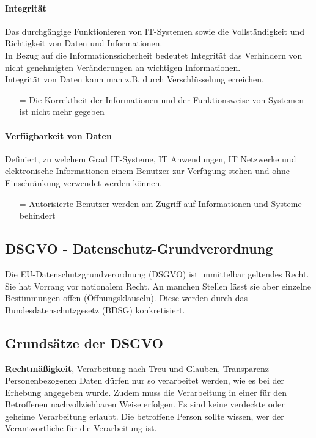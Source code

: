 \documentclass[asp1.tex]{subfiles}
\begin{document}
\paragraph{Integrität}
Das durchgängige Funktionieren von IT-Systemen sowie die Vollständigkeit und Richtigkeit von Daten und Informationen.\\ In Bezug auf die Informationssicherheit bedeutet Integrität das Verhindern von nicht genehmigten Veränderungen an wichtigen Informationen. \\
Integrität von Daten kann man z.B. durch Verschlüsselung erreichen.

\begin{itemize}
    \item[=] Die Korrektheit der Informationen und der Funktionsweise von Systemen ist nicht mehr gegeben
\end{itemize}
\paragraph{Verfügbarkeit  von Daten}
Definiert, zu welchem Grad IT-Systeme, IT Anwendungen, IT Netzwerke und elektronische Informationen einem Benutzer zur Verfügung stehen und ohne Einschränkung verwendet werden können.

\begin{itemize}
    \item[=] Autorisierte Benutzer werden am Zugriff auf Informationen und Systeme behindert
\end{itemize}

\subsection{DSGVO - Datenschutz-Grundverordnung}

Die EU-Datenschutzgrundverordnung (DSGVO) ist unmittelbar geltendes Recht. Sie hat Vorrang vor nationalem Recht. An manchen Stellen lässt sie aber einzelne Bestimmungen offen (Öffnungsklauseln). Diese werden durch das Bundesdatenschutzgesetz (BDSG) konkretisiert.

\subsection{Grundsätze der DSGVO}

\textbf{Rechtmäßigkeit}, Verarbeitung nach Treu und Glauben, Transparenz
Personenbezogenen Daten dürfen nur so verarbeitet werden, wie es bei der Erhebung angegeben wurde. Zudem muss die Verarbeitung in einer für den Betroffenen nachvollziehbaren Weise erfolgen. Es sind keine verdeckte oder geheime Verarbeitung erlaubt. Die betroffene Person sollte wissen, wer der Verantwortliche für die Verarbeitung ist.
\end{document}
